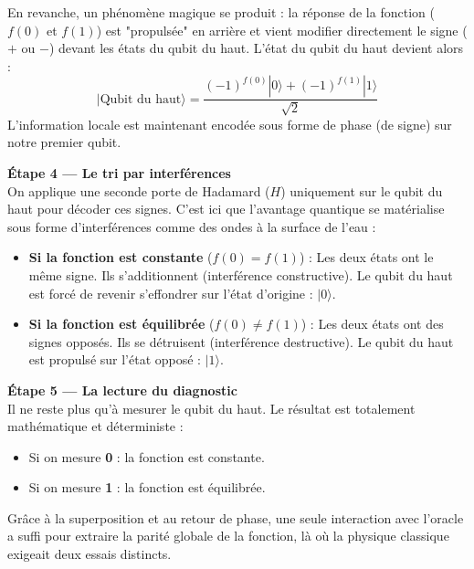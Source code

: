 \documentclass[a4paper,12pt]{article}
\begin{document}
En revanche, un phénomène magique se produit : la réponse de la fonction ($f(0)$ et $f(1)$) est "propulsée" en arrière et vient modifier directement le signe ($+$ ou $-$) devant les états du qubit du haut. L'état du qubit du haut devient alors :
\[
|\text{Qubit du haut}\rangle = \frac{(-1)^{f(0)}|0\rangle + (-1)^{f(1)}|1\rangle}{\sqrt{2}}
\]
L'information locale est maintenant encodée sous forme de phase (de signe) sur notre premier qubit.

\medskip
\textbf{Étape 4 — Le tri par interférences} \\
On applique une seconde porte de Hadamard ($H$) uniquement sur le qubit du haut pour décoder ces signes. C'est ici que l'avantage quantique se matérialise sous forme d'interférences comme des ondes à la surface de l'eau :
\begin{itemize}
    \item \textbf{Si la fonction est constante} ($f(0) = f(1)$) : Les deux états ont le même signe. Ils s'additionnent (interférence constructive). Le qubit du haut est forcé de revenir s'effondrer sur l'état d'origine : \textbf{$|0\rangle$}.
    \item \textbf{Si la fonction est équilibrée} ($f(0) \neq f(1)$) : Les deux états ont des signes opposés. Ils se détruisent (interférence destructive). Le qubit du haut est propulsé sur l'état opposé : \textbf{$|1\rangle$}.
\end{itemize}

\medskip
\textbf{Étape 5 — La lecture du diagnostic} \\
Il ne reste plus qu'à mesurer le qubit du haut. Le résultat est totalement mathématique et déterministe :
\begin{itemize}
    \item Si on mesure \textbf{0} : la fonction est constante.
    \item Si on mesure \textbf{1} : la fonction est équilibrée.
\end{itemize}

Grâce à la superposition et au retour de phase, une seule interaction avec l'oracle a suffi pour extraire la parité globale de la fonction, là où la physique classique exigeait deux essais distincts.
\end{document}
